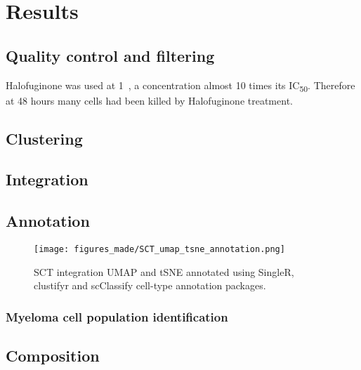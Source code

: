 \section{Results}

\subsection{Quality control and filtering}
Halofuginone was used at 1\si{\micro\Molar}, a concentration almost 10 times its IC\textsubscript{50}.
Therefore at 48 hours many cells had been killed by Halofuginone treatment.

\subsection{Clustering}

\subsection{Integration}

\subsection{Annotation}

\begin{figure}[htb]
\centering
\texttt{[image: figures\_made/SCT\_umap\_tsne\_annotation.png]}
\caption[Single-cell annotation]{SCT integration UMAP and tSNE annotated using SingleR, clustifyr and scClassify cell-type annotation packages.}
\label{fig:sc_annotation}
\end{figure}

\subsubsection{Myeloma cell population identification}


\subsection{Composition}

